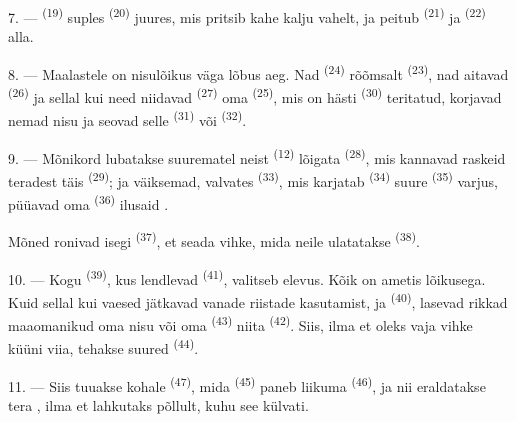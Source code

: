 7. ---  \textsuperscript{(19)} suples 
\textsuperscript{(20)} juures, mis pritsib kahe kalju vahelt, ja peitub
 \textsuperscript{(21)} ja 
\textsuperscript{(22)} alla.

\VUsaut{5.0mm}
\VUsaut{3.4mm}

8. --- Maalastele on nisulõikus väga lõbus aeg. Nad
\textsuperscript{(24)} rõõmsalt 
\textsuperscript{(23)}, nad aitavad  \textsuperscript{(26)} ja sellal
kui need niidavad  \textsuperscript{(27)} oma 
\textsuperscript{(25)}, mis on hästi  \textsuperscript{(30)} teritatud,
korjavad nemad nisu ja seovad selle  \textsuperscript{(31)} või
 \textsuperscript{(32)}.

9. --- Mõnikord lubatakse suurematel neist  \textsuperscript{(12)}
lõigata  \textsuperscript{(28)}, mis kannavad raskeid teradest
täis  \textsuperscript{(29)}; ja väiksemad, valvates 
\textsuperscript{(33)}, mis karjatab  \textsuperscript{(34)} suure
 \textsuperscript{(35)} varjus, püüavad oma 
\textsuperscript{(36)} ilusaid .

Mõned ronivad isegi  \textsuperscript{(37)}, et seada vihke, mida neile
ulatatakse  \textsuperscript{(38)}.

10. --- Kogu  \textsuperscript{(39)}, kus lendlevad 
\textsuperscript{(41)}, valitseb elevus. Kõik on ametis lõikusega. Kuid sellal kui
vaesed jätkavad vanade riistade kasutamist,  ja
 \textsuperscript{(40)}, lasevad rikkad maaomanikud oma nisu või oma
 \textsuperscript{(43)} niita  \textsuperscript{(42)}.
Siis, ilma et oleks vaja vihke küüni viia, tehakse suured 
\textsuperscript{(44)}.

11. --- Siis tuuakse kohale  \textsuperscript{(47)}, mida
 \textsuperscript{(45)} paneb liikuma 
\textsuperscript{(46)}, ja nii eraldatakse tera , ilma et lahkutaks
põllult, kuhu see külvati.

